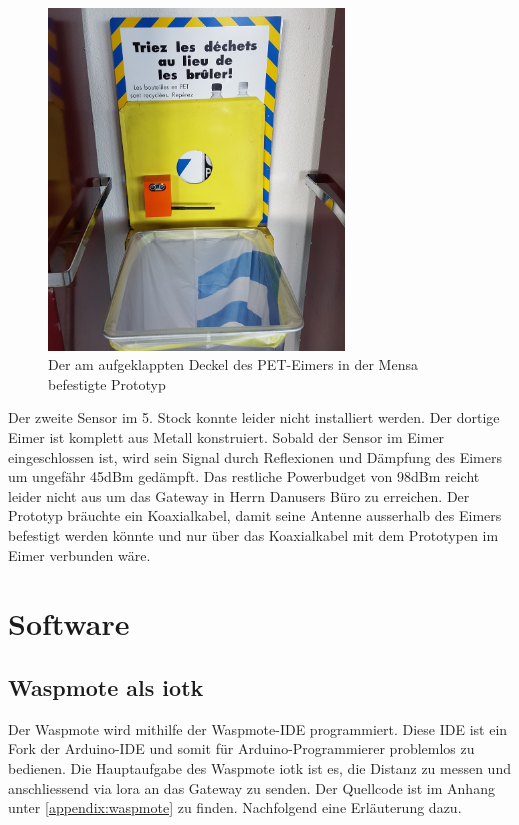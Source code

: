 \begin{figure}[H]
     \centering
        \includegraphics[width=0.7\textwidth]{pictures/Tresh-Deployed.jpg}
    \caption{Der am aufgeklappten Deckel des PET-Eimers in der Mensa befestigte Prototyp}
    \label{fig:3-Prototypes}
\end{figure}

Der zweite Sensor im 5. Stock konnte leider nicht installiert werden. Der dortige Eimer ist komplett aus Metall konstruiert. Sobald der Sensor im Eimer eingeschlossen ist, wird sein Signal durch Reflexionen und Dämpfung des Eimers um ungefähr 45dBm gedämpft. Das restliche Powerbudget von 98dBm reicht leider nicht aus um das Gateway in Herrn Danusers Büro zu erreichen. Der Prototyp bräuchte ein Koaxialkabel, damit seine Antenne ausserhalb des Eimers befestigt werden könnte und nur über das Koaxialkabel mit dem Prototypen im Eimer verbunden wäre.


\section{Software}

\subsection{Waspmote als \gls{iotk}}
Der Waspmote wird mithilfe der Waspmote-IDE programmiert. Diese IDE ist ein Fork der Arduino-IDE und somit für Arduino-Programmierer problemlos zu bedienen.
Die Hauptaufgabe des Waspmote \gls{iotk} ist es, die Distanz zu messen und anschliessend via \gls{lora} an das Gateway zu senden. Der Quellcode ist im Anhang unter \ref{appendix:waspmote} zu finden. Nachfolgend eine Erläuterung dazu.

